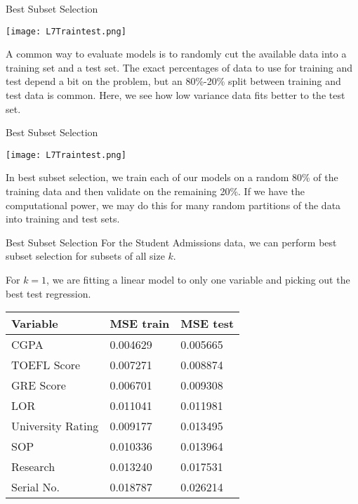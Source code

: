 \documentclass[10pt, table, dvipsnames,xcdraw, handout ]{beamer}
\begin{document}
\begin{frame}[fragile]{Best Subset Selection}
  \begin{minipage}[t][0.5\textheight][t]{\textwidth}
	\centering \texttt{[image: L7Traintest.png]} 
  \end{minipage}
  \vfill
\begin{minipage}[t][0.5\textheight][t]{\textwidth}
A common way to evaluate models is to randomly cut the available data into a training set and a test set. The exact percentages of data to use for training and test depend a bit on the problem, but an 80\%-20\% split between training and test data is common.  \pause Here, we see how low variance data fits better to the test set. 
\end{minipage}
\end{frame}


\begin{frame}[fragile]{Best Subset Selection}
  \begin{minipage}[t][0.5\textheight][t]{\textwidth}
	\centering \texttt{[image: L7Traintest.png]} 
  \end{minipage}
  \vfill
\begin{minipage}[t][0.5\textheight][t]{\textwidth}
In best subset selection, we train each of our models on a random 80\% of the training data and then validate on the remaining 20\%. \pause If we have the computational power, we may do this for many random partitions of the data into training and test sets. 
\end{minipage}
\end{frame}



\begin{frame}[fragile]{Best Subset Selection}
For the Student Admissions data, we can perform best subset selection for subsets of all size $k$.\pause\newline

For $k=1$, we are fitting a linear model to only one variable and picking out the best test regression.

\begin{table}[]
\begin{tabular}{lll}
\hline
\textbf{Variable} & \textbf{MSE train} & \textbf{MSE test} \\ \hline
CGPA 	&0.004629 	&0.005665\\
TOEFL Score 	&0.007271 	&0.008874\\
GRE Score  	&0.006701 	&0.009308\\
LOR	&0.011041 	&0.011981\\
University Rating 	&0.009177 	&0.013495\\
SOP	&0.010336 	&0.013964\\
Research	&0.013240 	&0.017531\\
Serial No.	&0.018787 	&0.026214
\end{tabular}
\end{table}
\end{frame}
\end{document}
